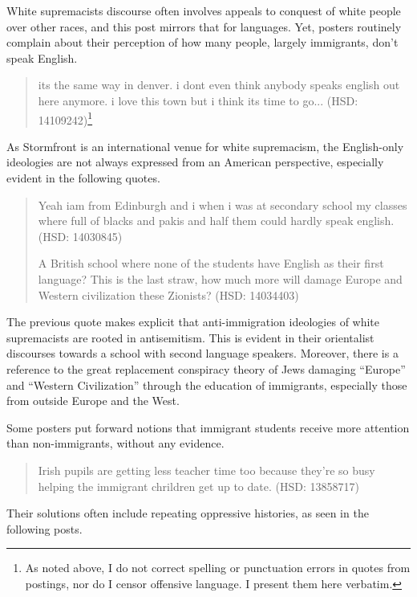 \documentclass[output=paper,colorlinks,citecolor=brown]{langscibook}
\begin{document}
\noindent White supremacists discourse often involves appeals to conquest of white people over other races, and this post mirrors that for languages. Yet, posters routinely complain about their perception of how many people, largely immigrants, don't speak English.

\begin{quote} 
its the same way in denver. i dont even think anybody speaks english out here anymore. i love this town but i think its time to go... (HSD: 14109242)\footnote{As noted above, I do not correct spelling or punctuation errors in quotes from postings, nor do I censor offensive language. I present them here verbatim.} 
\end{quote}

As Stormfront is an international venue for white supremacism, the English-only ideologies are not always expressed from an American perspective, especially evident in the following quotes.

\begin{quote}
Yeah iam from Edinburgh and i when i was at secondary school my classes where full of blacks and pakis and half them could hardly speak english.
(HSD: 14030845)

A British school where none of the students have English as their first language? This is the last straw, how much more will damage Europe and Western civilization these Zionists? (HSD: 14034403) 
\end{quote}

\noindent The previous quote makes explicit that anti-immigration ideologies of white supremacists are rooted in antisemitism. This is evident in their orientalist discourses towards a school with second language speakers. Moreover, there is a reference to the great replacement conspiracy theory of Jews damaging ``Europe'' and ``Western Civilization'' through the education of immigrants, especially those from outside Europe and the West.

Some posters put forward notions that immigrant students receive more attention than non-immigrants, without any evidence.

\begin{quote}
Irish pupils are getting less teacher time too because they're so busy helping the immigrant chrildren get up to date. (HSD: 13858717) 
\end{quote}

\noindent Their solutions often include repeating oppressive histories, as seen in the following posts.
\end{document}

